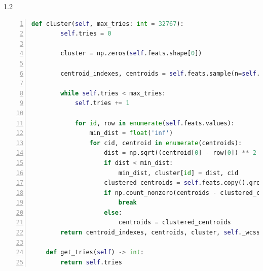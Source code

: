 \documentclass[a4paper,twoside]{article}
\begin{document}
\begin{spacing}{1.2}
\begin{lstlisting}[language=Python,numbers=left,style=PythonStyle,caption=瑞利分布生成,label={code:kmeans}]
	def cluster(self, max_tries: int = 32767):
		self.tries = 0
		
		cluster = np.zeros(self.feats.shape[0])
		
		centroid_indexes, centroids = self.feats.sample(n=self.k).index, self.feats.sample(n=self.k).values
		
		while self.tries < max_tries:
			self.tries += 1
			
			for id, row in enumerate(self.feats.values):
				min_dist = float('inf')
				for cid, centroid in enumerate(centroids):
					dist = np.sqrt((centroid[0] - row[0]) ** 2 + (centroid[1] - row[1]) ** 2)
					if dist < min_dist:
						min_dist, cluster[id] = dist, cid
					clustered_centroids = self.feats.copy().groupby(by=cluster).mean().values
					if np.count_nonzero(centroids - clustered_centroids) == 0:
						break
					else:
						centroids = clustered_centroids
		return centroid_indexes, centroids, cluster, self._wcss(centroids, cluster)
	
	def get_tries(self) -> int:
		return self.tries

\end{lstlisting}

\end{spacing}
\end{document}
